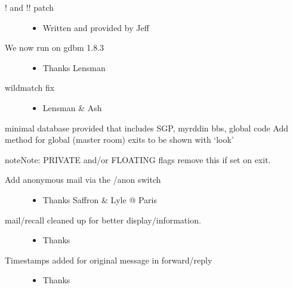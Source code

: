 \documentclass[letterpaper,10pt,english]{sphinxmanual}
\begin{document}
\begin{description}
\item[{! and !! patch}] \leavevmode\begin{itemize}
\item {} 
\sphinxAtStartPar
Written and provided by Jeff

\end{itemize}

\item[{We now run on gdbm 1.8.3}] \leavevmode\begin{itemize}
\item {} 
\sphinxAtStartPar
Thanks Lensman

\end{itemize}

\item[{wildmatch fix}] \leavevmode\begin{itemize}
\item {} 
\sphinxAtStartPar
Lensman \& Ash

\end{itemize}

\end{description}

\sphinxAtStartPar
minimal database provided that includes SGP, myrddin bbs, global code Add method for global (master room) exits to be shown with ‘look’

\begin{sphinxadmonition}{note}{Note:}
\sphinxAtStartPar
PRIVATE and/or FLOATING flags remove this if set on exit.
\end{sphinxadmonition}
\begin{description}
\item[{Add anonymous mail via the /anon switch}] \leavevmode\begin{itemize}
\item {} 
\sphinxAtStartPar
Thanks Saffron \& Lyle @ Paris

\end{itemize}

\item[{mail/recall cleaned up for better display/information.}] \leavevmode\begin{itemize}
\item {} 
\sphinxAtStartPar
Thanks 

\end{itemize}

\item[{Timestamps added for original message in forward/reply}] \leavevmode\begin{itemize}
\item {} 
\sphinxAtStartPar
Thanks 

\end{itemize}

\end{description}
\end{document}

